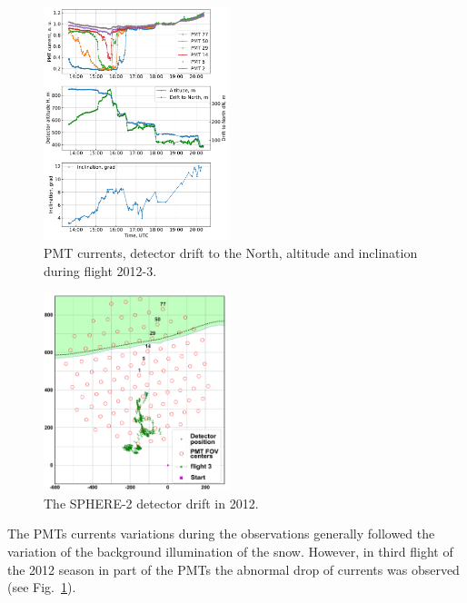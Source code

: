 \documentclass[final,5p,times,twocolumn]{elsarticle}
\begin{document}
\begin{figure}[t]
    \includegraphics[width=0.48\textwidth]{figs/2012-3_currents_H_dN.pdf}
    \caption{PMT currents, detector drift to the North, altitude and  inclination during flight 2012-3.}
    \label{fig:2012-3_currents}
\end{figure}

\begin{figure}[tb]
    \includegraphics[width=0.48\textwidth]{figs/2012_drift-mod.pdf}
    \caption{The SPHERE-2 detector drift in 2012. }
    \label{fig:2012-drift}
\end{figure}


The PMTs currents variations during the observations generally followed the variation of the background illumination of the snow. However, in third flight of the 2012 season in part of the PMTs the abnormal drop of currents was observed (see Fig.~\ref{fig:2012-3_currents}).
\end{document}
